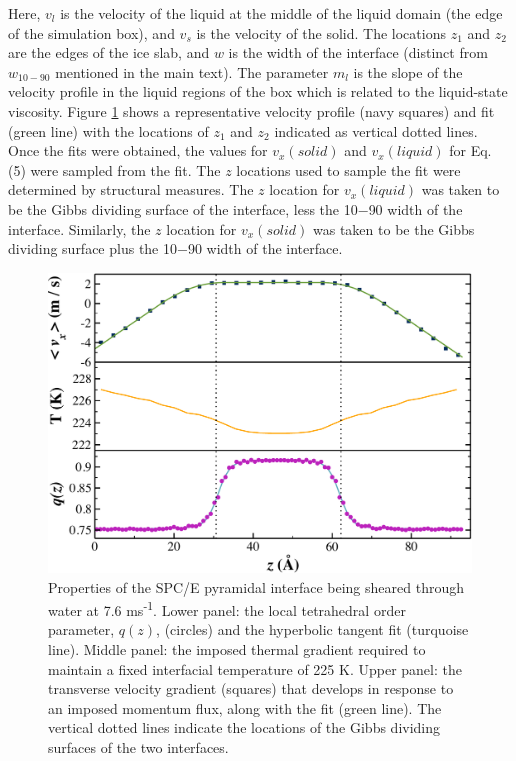 Here, $v_{l}$ is the velocity of the liquid at the middle of the
liquid domain (the edge of the simulation box), and $v_{s}$ is the
velocity of the solid. The locations $z_{1}$ and $z_{2}$ are the edges
of the ice slab, and $w$ is the width of the interface (distinct from
$w_{10-90}$ mentioned in the main text). The parameter $m_{l}$ is the
slope of the velocity profile in the liquid regions of the box which
is related to the liquid-state viscosity. Figure \ref{fig:pyrComic}
shows a representative velocity profile (navy squares) and fit (green
line) with the locations of $z_{1}$ and $z_{2}$ indicated as vertical
dotted lines. Once the fits were obtained, the values for
$v_{x}(solid)$ and $v_{x}(liquid)$ for Eq. (5) were sampled from the
fit. The $z$ locations used to sample the fit were determined by
structural measures. The $z$ location for $v_{x}(liquid)$ was taken to
be the Gibbs dividing surface of the interface, less the 10$-$90 width
of the interface. Similarly, the $z$ location for $v_{x}(solid)$ was
taken to be the Gibbs dividing surface plus the 10$-$90 width of the
interface.

\begin{figure}
\includegraphics[width=\linewidth]{Figures/Pyr_comic_strip}
\caption{\label{fig:pyrComic} Properties of the SPC/E pyramidal
  interface being sheared through water at 7.6
  ms\textsuperscript{-1}. Lower panel: the local tetrahedral order
  parameter, $q(z)$, (circles) and the hyperbolic tangent fit
  (turquoise line).  Middle panel: the imposed thermal gradient
  required to maintain a fixed interfacial temperature of 225 K. Upper
  panel: the transverse velocity gradient (squares) that develops in
  response to an imposed momentum flux, along with the fit (green
  line). The vertical dotted lines indicate the locations of the Gibbs
  dividing surfaces of the two interfaces.}
\end{figure}

